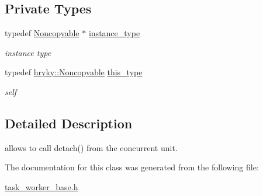 \subsection*{Private Types}
\begin{DoxyCompactItemize}
\item 
\hypertarget{classhryky_1_1_noncopyable_aaf87abb55f700af85ecb0895f6178821}{typedef \hyperlink{classhryky_1_1_noncopyable}{Noncopyable} $\ast$ \hyperlink{classhryky_1_1_noncopyable_aaf87abb55f700af85ecb0895f6178821}{instance\-\_\-type}}\label{classhryky_1_1_noncopyable_aaf87abb55f700af85ecb0895f6178821}

\begin{DoxyCompactList}\small\item\em instance type \end{DoxyCompactList}\item 
\hypertarget{classhryky_1_1_noncopyable_acf13ad1c98a76247a561dff514979da5}{typedef \hyperlink{classhryky_1_1_noncopyable}{hryky\-::\-Noncopyable} \hyperlink{classhryky_1_1_noncopyable_acf13ad1c98a76247a561dff514979da5}{this\-\_\-type}}\label{classhryky_1_1_noncopyable_acf13ad1c98a76247a561dff514979da5}

\begin{DoxyCompactList}\small\item\em self \end{DoxyCompactList}\end{DoxyCompactItemize}


\subsection{Detailed Description}
allows to call detach() from the concurrent unit. 

The documentation for this class was generated from the following file\-:\begin{DoxyCompactItemize}
\item 
\hyperlink{task__worker__base_8h}{task\-\_\-worker\-\_\-base.\-h}\end{DoxyCompactItemize}
